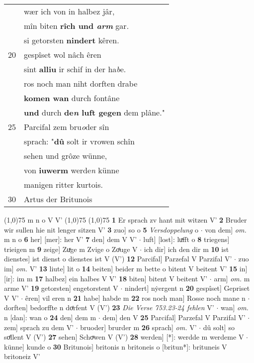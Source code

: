 \documentclass[8pt,a4paper,notitlepage]{article}
\begin{document}
\begin{table}[ht]
\begin{minipage}[t]{0.5\linewidth}
\begin{tabular}{rl}
 & wær ich von in halbez jâr,\\ 
 & mîn biten \textbf{rîch und \textit{arm}} gar.\\ 
 & si getorsten \textbf{nindert} kêren.\\ 
20 & gespîset wol nâch êren\\ 
 & sint \textbf{alliu} ir schif in der ha\textit{b}e.\\ 
 & ros noch man niht dorften drabe\\ 
 & \textbf{komen wan} durch fontâne\\ 
 & \textbf{und} durch \textbf{de\textit{n} luft gegen} dem plâne."\\ 
25 & Parcifal zem bru\textit{o}der sîn\\ 
 & sprach: "\textbf{dû} solt ir vrowen schîn\\ 
 & sehen und grôze wünne,\\ 
 & von \textbf{iuwerm} werde\textit{n} künne\\ 
 & manigen ritter kurtois.\\ 
30 & Artus der Britunois\\ 
\end{tabular}
\scriptsize
\line(1,0){75} \newline
m n o V V' \newline
\line(1,0){75} \newline
\newline
\line(1,0){75} \newline
\textbf{1} Er sprach zv hant mit witzen V' \textbf{2} Bruder wir sullen hie nit lenger sitzen V' \textbf{3} zuo] so o \textbf{5} \textit{Versdoppelung} o   $\cdot$ von dem] \textit{om.} m n o \textbf{6} her] [mer]: her V' \textbf{7} den] dem V V'  $\cdot$ luft] [lost]: luͯfft o \textbf{8} triegens] trieigen m \textbf{9} zeige] Zuͯge m Zvige o Zoͤuge V  $\cdot$ ich dir] ich den dir m \textbf{10} ist dienstes] ist dienst o dienstes ist V (V') \textbf{12} Parcifal] Parzefal V Parzifal V'  $\cdot$ zuo im] \textit{om.} V' \textbf{13} liute] lit o \textbf{14} beiten] beider m bette o bitent V beitent V' \textbf{15} in] [ir]: im m \textbf{17} halbez] ein halbes V V' \textbf{18} biten] bitent V beitent V'  $\cdot$ arm] \textit{om.} m arme V' \textbf{19} getorsten] engetorstent V  $\cdot$ nindert] nẏergent n \textbf{20} gespîset] Gepriset V V'  $\cdot$ êren] vil eren n \textbf{21} habe] habde m \textbf{22} ros noch man] Rosse noch mane n  $\cdot$ dorften] bedorffte n doͤrfent V (V') \textbf{23} \textit{Die Verse 753.23-24 fehlen} V'   $\cdot$ wan] \textit{om.} n [dan]: wan o \textbf{24} den] dem m  $\cdot$ dem] den V \textbf{25} Parcifal] Parzefal V Parzifal V'  $\cdot$ zem] sprach zu dem V'  $\cdot$ bruoder] brurder m \textbf{26} sprach] \textit{om.} V'  $\cdot$ dû solt] so soͤllent V (V') \textbf{27} sehen] Schoͮwen V (V') \textbf{28} werden] [*]: werdde m werdeme V  $\cdot$ künne] kunde o \textbf{30} Britunois] britonis n britoneis o [britun*]: brituneis V britoneiz V' \newline
\end{minipage}
\end{table}
\end{document}

